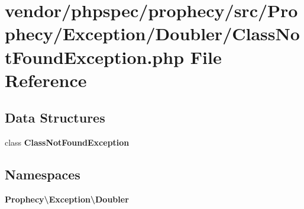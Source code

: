 \section{vendor/phpspec/prophecy/src/\+Prophecy/\+Exception/\+Doubler/\+Class\+Not\+Found\+Exception.php File Reference}
\label{phpspec_2prophecy_2src_2_prophecy_2_exception_2_doubler_2_class_not_found_exception_8php}
\subsection*{Data Structures}
\begin{DoxyCompactItemize}
\item 
class {\bf Class\+Not\+Found\+Exception}
\end{DoxyCompactItemize}
\subsection*{Namespaces}
\begin{DoxyCompactItemize}
\item 
 {\bf Prophecy\textbackslash{}\+Exception\textbackslash{}\+Doubler}
\end{DoxyCompactItemize}
